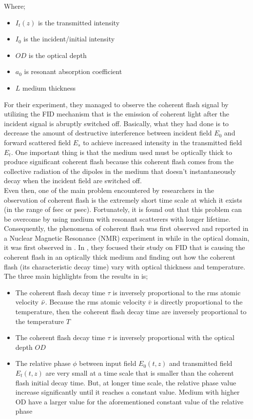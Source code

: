 Where;

\begin{itemize}
    \item $I_{t}(z)$ is the transmitted intensity
    \item $I_{0}$ is the incident/initial intensity
    \item $OD$ is the optical depth
    \item $a_{0}$ is resonant absorption coefficient
    \item $L$ medium thickness
\end{itemize}

For their experiment, they managed to observe the coherent flash signal by utilizing the FID mechanism that is the emission of coherent light after the incident signal is abruptly switched off. Basically, what they had done is to decrease the amount of destructive interference between incident field $E_0$ and forward scattered field $E_s$ to achieve increased intensity in the transmitted field $E_t$. One important thing is that the medium used must be optically thick to produce significant coherent flash because this coherent flash comes from the collective radiation of the dipoles in the medium that doesn't instantaneously decay when the incident field are switched off.\\

Even then, one of the main problem encountered by researchers in the observation of coherent flash is the extremely short time scale at which it exists (in the range of fsec or psec). Fortunately, it is found out that this problem can be overcome by using medium with resonant scatterers with longer lifetime. Consequently, the phenomena of coherent flash was first observed and reported in a Nuclear Magnetic Resonance (NMR) experiment in \cite{Hahn1950} while in the optical domain, it was first observed in \cite{Brewer1972, Foster1974}. In \cite{Chalony2011}, they focused their study on FID that is causing the coherent flash in an optically thick medium and finding out how the coherent flash (its characteristic decay time) vary with optical thickness and temperature. The three main highlights from the results in \cite{Chalony2011} is;

\begin{itemize}
    \item The coherent flash decay time $\tau$ is inversely proportional to the rms atomic velocity $\Bar{\nu}$. Because the rms atomic velocity $\bar{v}$ is directly proportional to the temperature, then the coherent flash decay time are inversely proportional to the temperature $T$
    \item The coherent flash decay time $\tau$ is inversely proportional with the optical depth $OD$
    \item The relative phase $\phi$ between input field $E_{0}(t, z)$ and transmitted field $E_{t}(t, z)$ are very small at a time scale that is smaller than the coherent flash initial decay time. But, at longer time scale, the relative phase value increase significantly until it reaches a constant value. Medium with higher OD have a larger value for the aforementioned constant value of the relative phase
\end{itemize}

